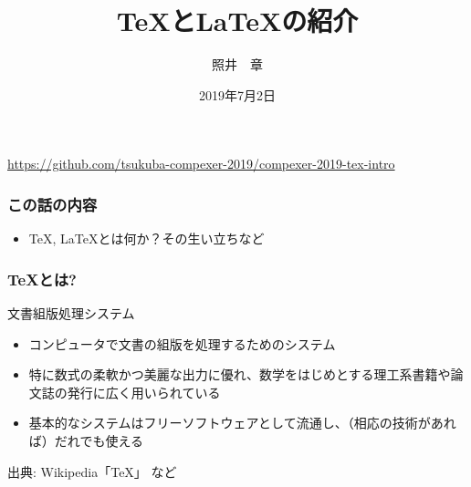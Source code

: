 \documentclass[dvipdfmx]{beamer}
\title{\TeX と\LaTeX の紹介}
\author{照井　章}
\institute{筑波大学 数理物質系}
\date{2019年7月2日}
\begin{document}
    
\begin{frame}
    \frametitle{}
    \titlepage

    \begin{center}
        \url{https://github.com/tsukuba-compexer-2019/compexer-2019-tex-intro}
    \end{center}
\end{frame}

\begin{frame}
    \frametitle{この話の内容}
    \large
    \begin{itemize}
        \item \TeX, \LaTeX とは何か？その生い立ちなど
    \end{itemize}
\end{frame}

\begin{frame}
    \frametitle{\TeX とは?}

    \begin{block}{文書組版処理システム}
        \begin{itemize}
            \item コンピュータで文書の組版を処理するためのシステム
            \item 特に数式の柔軟かつ美麗な出力に優れ、数学をはじめとする理工系書籍や論文誌の発行に広く用いられている
            \item 基本的なシステムはフリーソフトウェアとして流通し、（相応の技術があれば）だれでも使える
        \end{itemize}
    \end{block}

    \begin{flushright}
        出典: Wikipedia「TeX」\cite{tex-wikipedia} など
    \end{flushright}
\end{frame}
\end{document}
